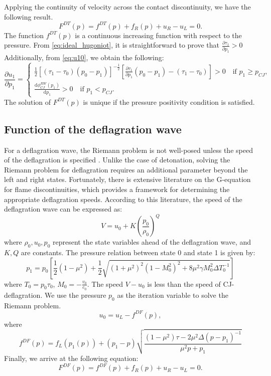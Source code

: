 Applying the continuity of velocity across the contact discontinuity,
we have the following result.
\begin{equation}
F^{DT}(p) = f^{DT}(p)+f_R(p) + u_R - u_L = 0.
\label{eq:Fdet}
\end{equation}
The function $f^{DT}(p)$ is a continuous increasing function with respect to the pressure.
From \eqref{eq:ideal_hugoniot}, it is straightforward to prove that $\frac{\partial \tau_1}{\partial p_1}>0$
Additionally, from \eqref{eq:u10}, we obtain the following:
\begin{equation}
\frac{\partial u_1}{\partial p_1} =
\begin{cases}
\frac{1}{2}\left[(\tau_1-\tau_0)(p_0-p_1) \right]^{-\frac{1}{2}}\left[ \frac{\partial \tau_1}{\partial p_1}(p_0-p_1)-(\tau_1 -\tau_0) \right] >0 \quad \text{if } p_1\geq p_{CJ}, \\
\frac{\mathrm{d} \phi^{RW}_{CJ}(p_1)}{\mathrm{d} p_1} >0 \quad \text{if } p_1<p_{CJ}.
\end{cases}
\end{equation}
The solution of $F^{DT}(p)$ is unique if the pressure positivity condition is satisfied.

\subsection{Function of the deflagration wave}
For a deflagration wave, the Riemann problem is not well-posed unless the speed of the deflagration is specified \cite{colomboSonicKineticPhase2004,fedkiwGhostFluidMethod}. Unlike the case of detonation, solving the Riemann problem for deflagration requires an additional parameter beyond the left and right states.
Fortunately, there is extensive literature on the G-equation for flame discontinuities, which provides a framework for determining the appropriate deflagration speeds. According to this literature, the speed of the deflagration wave can be expressed as:
\begin{equation}
V = u_0 + K \left( \frac{p_0}{\rho_0}\right)^{Q}
\end{equation}
where $\rho_0,u_0,p_0$ represent the state variables ahead of the deflagration wave, and $K,Q$ are constants.
% 
The pressure relation between state 0 and state 1 is given by:
\begin{equation}
  p_1 = p_0 \left[ \frac{1}{2}(1-\mu^2) + \frac{1}{2} \sqrt{(1+\mu^2)^2(1-M^2_0)^2 +8\mu^2 \gamma M_0^2 \Delta T_0^{-1}} \right]
\label{eq:p1def}
\end{equation}
where $T_0=p_0\tau_0$, $M_0 = -\frac{v_0}{c_0}$. 
The speed $V-u_0$ is less than the speed of CJ-deflagration.
We use the pressure $p_0$ as the iteration variable to solve the Riemann problem.
$$
u_0 = u_L-f^{DF}(p), 
$$
where
\begin{equation}
f^{DF}(p) = f_L(p_1(p)) + (p_1-p)\sqrt{\frac{(1-\mu^2)\tau-2\mu^2 \Delta (p-p_1)^{-1}}{\mu^2p+p_1}} 
\end{equation}
Finally, we arrive at the following equation:
\begin{equation}
F^{DF}(p) = f^{DF}(p)+f_R(p) + u_R - u_L = 0.
\label{eq:Fdef}
\end{equation}

